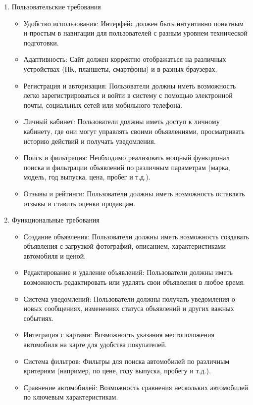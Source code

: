 \begin{enumerate}
    \item Пользовательские требования
        \begin{itemize}
            \item Удобство использования: Интерфейс должен быть интуитивно понятным и простым в навигации для пользователей с разным уровнем технической подготовки.
            \item Адаптивность: Сайт должен корректно отображаться на различных устройствах (ПК, планшеты, смартфоны) и в разных браузерах.
            \item Регистрация и авторизация: Пользователи должны иметь возможность легко зарегистрироваться и войти в систему с помощью электронной почты, социальных сетей или мобильного телефона.
            \item Личный кабинет: Пользователи должны иметь доступ к личному кабинету, где они могут управлять своими объявлениями, просматривать историю действий и получать уведомления.
            \item Поиск и фильтрация: Необходимо реализовать мощный функционал поиска и фильтрации объявлений по различным параметрам (марка, модель, год выпуска, цена, пробег и т.д.).
            \item Отзывы и рейтинги: Пользователи должны иметь возможность оставлять отзывы и ставить оценки продавцам.
        \end{itemize}
    \item Функциональные требования
        \begin{itemize}
            \item Создание объявления: Пользователи должны иметь возможность создавать объявления с загрузкой фотографий, описанием, характеристиками автомобиля и ценой.
            \item Редактирование и удаление объявлений: Пользователи должны иметь возможность редактировать или удалять свои объявления в любое время.
            \item Система уведомлений: Пользователи должны получать уведомления о новых сообщениях, изменениях статуса объявлений и других важных событиях.
            \item Интеграция с картами: Возможность указания местоположения автомобиля на карте для удобства покупателей.
            \item Система фильтров: Фильтры для поиска автомобилей по различным критериям (например, по цене, году выпуска, пробегу и т.д.).
            \item Сравнение автомобилей: Возможность сравнения нескольких автомобилей по ключевым характеристикам.

\end{itemize}
\end{enumerate}
